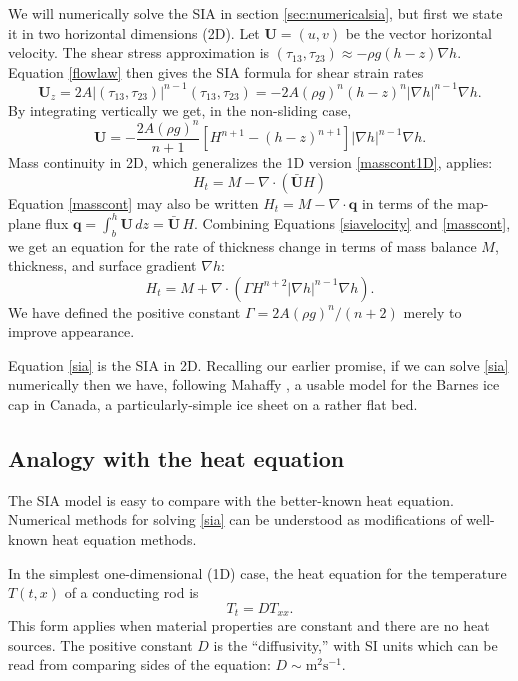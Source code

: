 \documentclass[letterpaper,final,12pt,reqno]{amsart}
\newcommand{\bq}{\mathbf{q}}
\newcommand{\grad}{\nabla}
\newcommand{\Div}{\nabla\cdot}
\begin{document}
We will numerically solve the SIA in section \ref{sec:numericalsia}, but first we state it in two horizontal dimensions (2D).  Let $\mathbf{U} = (u,v)$ be the vector horizontal velocity.  The shear stress approximation is $(\tau_{13},\tau_{23}) \approx - \rho g (h-z) \nabla h$.  Equation \eqref{flowlaw} then gives the SIA formula for shear strain rates
\begin{equation*}
\mathbf{U}_z = 2 A |(\tau_{13},\tau_{23})|^{n-1} (\tau_{13},\tau_{23}) = - 2 A (\rho g)^n (h-z)^n |\nabla h|^{n-1} \nabla h.
\end{equation*}
By integrating vertically we get, in the non-sliding case,
\begin{equation}
\mathbf{U} = - \frac{2 A (\rho g)^n}{n+1} \left[H^{n+1} - (h-z)^{n+1}\right] |\nabla h|^{n-1} \nabla h.  \label{siavelocity}
\end{equation}
Mass continuity in 2D, which generalizes the 1D version \eqref{masscont1D}, applies:
\begin{equation}
    H_t = M - \Div\left(\bar{\mathbf{U}} H\right)  \label{masscont}
\end{equation}
Equation \eqref{masscont} may also be written $H_t = M - \Div \bq$ in terms of the map-plane flux $\bq = \int_{b}^{h} \mathbf{U}\,dz = \bar{\mathbf{U}}\,H$.  Combining Equations \eqref{siavelocity} and \eqref{masscont}, we get an equation for the rate of thickness change in terms of mass balance $M$, thickness, and surface gradient $\grad h$:
\begin{equation}
H_t = M + \Div \left(\Gamma H^{n+2} |\grad h|^{n-1} \grad h \right). \label{sia}
\end{equation}
We have defined the positive constant $\Gamma = 2 A (\rho g)^n / (n+2)$ merely to improve appearance.

Equation \eqref{sia} is the SIA in 2D.  Recalling our earlier promise, if we can solve \eqref{sia} numerically then we have, following Mahaffy \cite{Mahaffy}, a usable model for the Barnes ice cap in Canada, a particularly-simple ice sheet on a rather flat bed.

\subsection*{Analogy with the heat equation}  The SIA model is easy to compare with the better-known heat equation.  Numerical methods for solving \eqref{sia} can be understood as modifications of well-known heat equation methods.

In the simplest one-dimensional (1D) case, the heat equation for the temperature $T(t,x)$ of a conducting rod is
\begin{equation}
  T_t = D T_{xx}. \label{heat1D}
\end{equation}
This form applies when material properties are constant and there are no heat sources.  The positive constant $D$ is the ``diffusivity,'' with SI units which can be read from comparing sides of the equation: $D\sim \text{m}^2 \text{s}^{-1}$.
\end{document}
